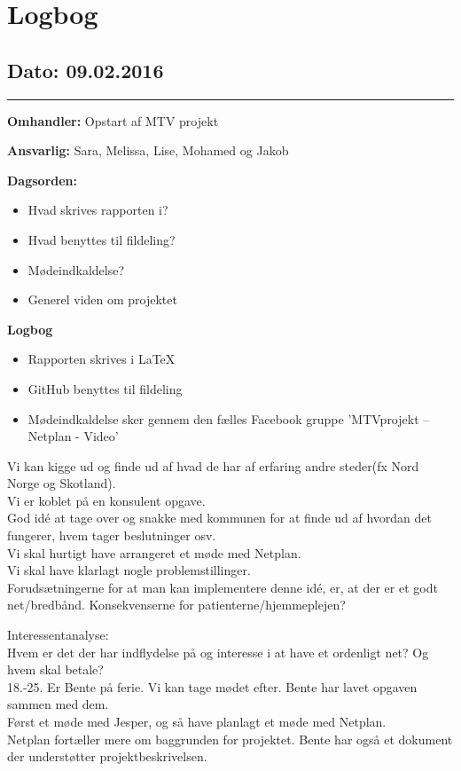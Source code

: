 \chapter{Logbog}

\section{Dato: 09.02.2016}
\hrule

\textbf{Omhandler:} Opstart af MTV projekt

\textbf{Ansvarlig:} Sara, Melissa, Lise, Mohamed og Jakob

\textbf{Dagsorden:}
\begin{itemize}
	\item Hvad skrives rapporten i?
	\item Hvad benyttes til fildeling?
	\item Mødeindkaldelse?
	\item Generel viden om projektet
\end{itemize}

\textbf{Logbog}
\begin{itemize}
	\item Rapporten skrives i LaTeX
	\item GitHub benyttes til fildeling
	\item Mødeindkaldelse sker gennem den fælles Facebook gruppe ’MTVprojekt – Netplan - Video’
\end{itemize}

Vi kan kigge ud og finde ud af hvad de har af erfaring andre steder(fx Nord Norge og Skotland).\\
Vi er koblet på en konsulent opgave.\\
God idé at tage over og snakke med kommunen for at finde ud af hvordan det fungerer, hvem tager beslutninger osv.\\
Vi skal hurtigt have arrangeret et møde med Netplan.\\
Vi skal have klarlagt nogle problemstillinger. \\
Forudsætningerne for at man kan implementere denne idé, er, at der er et godt net/bredbånd.
Konsekvenserne for patienterne/hjemmeplejen?

Interessentanalyse: \\
Hvem er det der har indflydelse på og interesse i at have et ordenligt net?
Og hvem skal betale?\\ 
18.-25. Er Bente på ferie.
Vi kan tage mødet efter. Bente har lavet opgaven sammen med dem.\\
Først et møde med Jesper, og så have planlagt et møde med Netplan.\\
Netplan fortæller mere om baggrunden for projektet.
Bente har også et dokument der understøtter projektbeskrivelsen.
\\
